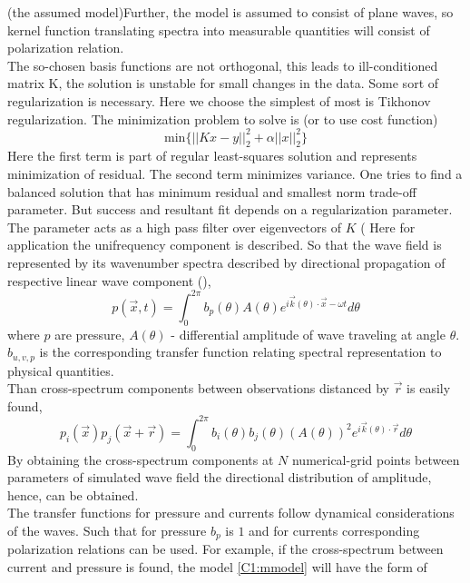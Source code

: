 (the assumed model)Further, the model is assumed to consist of plane waves, so kernel function translating spectra into measurable quantities will consist of polarization relation.\\

The so-chosen basis functions are not orthogonal, this leads to ill-conditioned matrix K, the solution is unstable for small changes in the data. Some sort of regularization is necessary. Here we choose the simplest of most is Tikhonov regularization. The minimization problem to solve is (or to use cost function)
\begin{equation}
\label{Tikh_prob}
\text{min}\{||K x - y||^2_2 + \alpha ||x||^2_2\}
\end{equation}
Here the first term is part of regular least-squares solution and represents minimization of residual. The second term minimizes variance. One tries to find a balanced solution that has minimum residual and smallest norm trade-off parameter.
But success and resultant fit depends on a regularization parameter. The parameter acts as a high pass filter over eigenvectors of $K$ (\cite{}
Here for application the unifrequency component is described. So that the wave field is represented by its wavenumber spectra described by directional propagation of respective linear wave component (\cite{long1986inverse}),
\begin{equation}
p(\vec{x}, t) = \int_{0}^{2\pi} b_{p}(\theta) A(\theta) e^{i \vec{k}(\theta) \cdot \vec{x} - \omega t} d \theta
\end{equation}
where $p$ are pressure, $A(\theta)$ - differential amplitude of wave traveling at angle $\theta$. $b_{u,v,p}$ is the corresponding transfer function relating spectral representation to physical quantities.\\
Than cross-spectrum components between observations distanced by $\vec{r}$ is easily found,
\begin{equation}
p_i(\vec{x}) p_j(\vec{x} + \vec{r}) = \int_{0}^{2\pi} b_{i}(\theta) b_{j}(\theta) (A(\theta))^2 e^{i \vec{k}(\theta) \cdot \vec{r}} d \theta \label{C1:mmodel}
\end{equation}
By obtaining the cross-spectrum components at $N$ numerical-grid points between parameters of simulated wave field the directional distribution of amplitude, hence, can be obtained.\\
The transfer functions for pressure and currents follow dynamical considerations of the waves. Such that for pressure $b_{p}$ is $1$ and for currents corresponding polarization relations can be used. For example, if the cross-spectrum between current and pressure is found, the model \eqref{C1:mmodel} will have the form of

